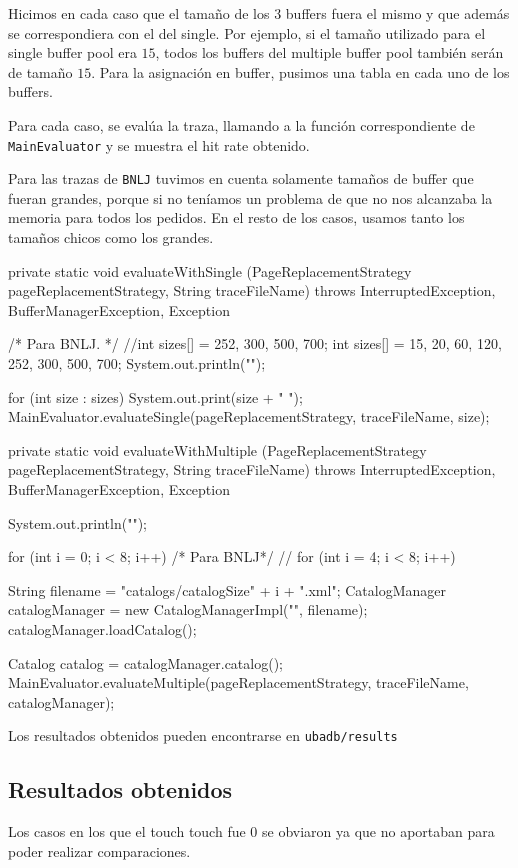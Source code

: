 Hicimos en cada caso que el tamaño de los 3 buffers fuera el mismo y
que además se correspondiera con el del single. 
Por ejemplo, si el tamaño utilizado para el single buffer pool era
$15$, todos los buffers del multiple buffer pool también serán de 
tamaño $15$.
Para la asignación en buffer, pusimos una tabla en cada uno de los
buffers.

\vspace*{0.5cm}

Para cada caso, se evalúa la traza, llamando a la función correspondiente
de \texttt{MainEvaluator} y se muestra el hit rate obtenido.

\vspace*{0.5cm}

Para las trazas de \texttt{BNLJ} tuvimos en cuenta solamente tamaños
de buffer que fueran grandes, porque si no teníamos un problema de
que no nos alcanzaba la memoria para todos los pedidos.
En el resto de los casos, usamos tanto los tamaños chicos como los
grandes.

\begin{verbatimtab}[4]
private static void evaluateWithSingle
	(PageReplacementStrategy pageReplacementStrategy, String traceFileName) 
	throws InterruptedException, BufferManagerException, Exception
{
	/* Para BNLJ. */ //int sizes[] = {252, 300, 500, 700}; 
	int sizes[] = {15, 20, 60, 120, 252, 300, 500, 700};
	System.out.println("\nSingleBufferPool\n");
	
	for (int size : sizes)
	{		
		System.out.print(size + " ");
		MainEvaluator.evaluateSingle(pageReplacementStrategy, traceFileName, size);			
	}
}
\end{verbatimtab}

\newpage
\begin{verbatimtab}[4]
private static void evaluateWithMultiple
	(PageReplacementStrategy pageReplacementStrategy, String traceFileName) 
	throws InterruptedException, BufferManagerException, Exception
{	
	System.out.println("\nMultipleBufferPool\n");
	
	for (int i = 0; i < 8; i++)
	/* Para BNLJ*/ // for (int i = 4; i < 8; i++)
	{
		String filename = "catalogs/catalogSize" + i + ".xml";
		CatalogManager catalogManager = new CatalogManagerImpl("", filename);
		catalogManager.loadCatalog();
		
		Catalog catalog = catalogManager.catalog();		
		MainEvaluator.evaluateMultiple(pageReplacementStrategy, 
								traceFileName, catalogManager);
	}
}
\end{verbatimtab}


Los resultados obtenidos pueden encontrarse en \texttt{ubadb/results}


\subsection{Resultados obtenidos}

Los casos en los que el touch touch fue 0 se obviaron ya que no 
aportaban para poder realizar comparaciones.


